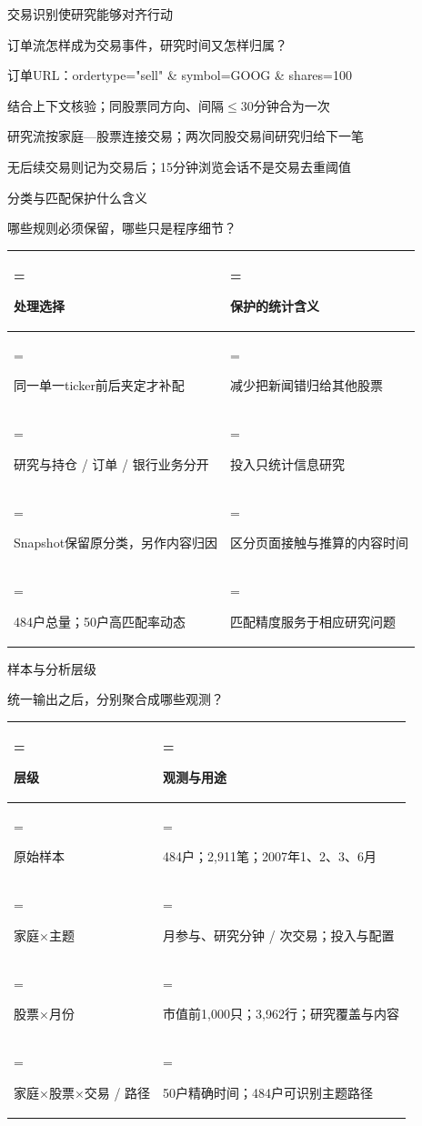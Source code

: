 \documentclass[11pt,compress]{beamer}
\begin{document}
\begin{frame}{交易识别使研究能够对齐行动}\relax
{\small\color{tsinghua}订单流怎样成为交易事件，研究时间又怎样归属？\par}\medskip
订单URL：ordertype="sell" \& symbol=GOOG \& shares=100\par\medskip
结合上下文核验；同股票同方向、间隔\(\le\)30分钟合为一次\par\medskip
研究流按家庭—股票连接交易；两次同股交易间研究归给下一笔\par\medskip
无后续交易则记为交易后；15分钟浏览会话不是交易去重阈值\par\medskip
{}
\end{frame}
\begin{frame}{分类与匹配保护什么含义}\relax
{\small\color{tsinghua}哪些规则必须保留，哪些只是程序细节？\par}\medskip
{\small\renewcommand{\arraystretch}{1.12}
\begin{tabularx}{\linewidth}{@{}>{\hsize=0.740\hsize\linewidth=\hsize\raggedright\arraybackslash}X>{\hsize=1.260\hsize\linewidth=\hsize\raggedright\arraybackslash}X@{}}\toprule
\textbf{处理选择} & \textbf{保护的统计含义}\\
\midrule
同一单一ticker前后夹定才补配 & 减少把新闻错归给其他股票\\
研究与持仓 / 订单 / 银行业务分开 & 投入只统计信息研究\\
Snapshot保留原分类，另作内容归因 & 区分页面接触与推算的内容时间\\
484户总量；50户高匹配率动态 & 匹配精度服务于相应研究问题\\
\bottomrule\end{tabularx}}
\medskip
{}
\end{frame}
\begin{frame}{样本与分析层级}\relax
{\small\color{tsinghua}统一输出之后，分别聚合成哪些观测？\par}\medskip
{\small\renewcommand{\arraystretch}{1.12}
\begin{tabularx}{\linewidth}{@{}>{\hsize=0.740\hsize\linewidth=\hsize\raggedright\arraybackslash}X>{\hsize=1.260\hsize\linewidth=\hsize\raggedright\arraybackslash}X@{}}\toprule
\textbf{层级} & \textbf{观测与用途}\\
\midrule
原始样本 & 484户；2,911笔；2007年1、2、3、6月\\
家庭×主题 & 月参与、研究分钟 / 次交易；投入与配置\\
股票×月份 & 市值前1,000只；3,962行；研究覆盖与内容\\
家庭×股票×交易 / 路径 & 50户精确时间；484户可识别主题路径\\
\bottomrule\end{tabularx}}
\medskip
{}
\end{frame}
\end{document}

